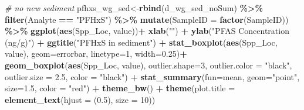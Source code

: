 \documentclass[
]{article}
\newenvironment{Shaded}{\begin{snugshade}}{\end{snugshade}}
\newcommand{\AttributeTok}[1]{\textcolor[rgb]{0.13,0.29,0.53}{#1}}
\newcommand{\CommentTok}[1]{\textcolor[rgb]{0.56,0.35,0.01}{\textit{#1}}}
\newcommand{\DecValTok}[1]{\textcolor[rgb]{0.00,0.00,0.81}{#1}}
\newcommand{\FloatTok}[1]{\textcolor[rgb]{0.00,0.00,0.81}{#1}}
\newcommand{\FunctionTok}[1]{\textcolor[rgb]{0.13,0.29,0.53}{\textbf{#1}}}
\newcommand{\NormalTok}[1]{#1}
\newcommand{\OtherTok}[1]{\textcolor[rgb]{0.56,0.35,0.01}{#1}}
\newcommand{\SpecialCharTok}[1]{\textcolor[rgb]{0.81,0.36,0.00}{\textbf{#1}}}
\newcommand{\StringTok}[1]{\textcolor[rgb]{0.31,0.60,0.02}{#1}}
\begin{document}
\begin{Shaded}
\begin{Highlighting}[]
\CommentTok{\# no new sediment}
\NormalTok{pfhxs\_wg\_sed}\OtherTok{\textless{}{-}}\FunctionTok{rbind}\NormalTok{(d\_wg\_sed\_noSum) }\SpecialCharTok{\%\textgreater{}\%} 
  \FunctionTok{filter}\NormalTok{(Analyte }\SpecialCharTok{==} \StringTok{"PFHxS"}\NormalTok{) }\SpecialCharTok{\%\textgreater{}\%} 
  \FunctionTok{mutate}\NormalTok{(}\AttributeTok{SampleID =} \FunctionTok{factor}\NormalTok{(SampleID)) }\SpecialCharTok{\%\textgreater{}\%} 
  \FunctionTok{ggplot}\NormalTok{(}\FunctionTok{aes}\NormalTok{(Spp\_Loc, value))}\SpecialCharTok{+}
    \FunctionTok{xlab}\NormalTok{(}\StringTok{""}\NormalTok{) }\SpecialCharTok{+}
    \FunctionTok{ylab}\NormalTok{(}\StringTok{"PFAS Concentration (ng/g)"}\NormalTok{) }\SpecialCharTok{+}
    \FunctionTok{ggtitle}\NormalTok{(}\StringTok{"PFHxS in sediment"}\NormalTok{) }\SpecialCharTok{+}
    \FunctionTok{stat\_boxplot}\NormalTok{(}\FunctionTok{aes}\NormalTok{(Spp\_Loc, value),}
                 \AttributeTok{geom=}\StringTok{\textquotesingle{}errorbar\textquotesingle{}}\NormalTok{, }\AttributeTok{linetype=}\DecValTok{1}\NormalTok{, }\AttributeTok{width=}\FloatTok{0.25}\NormalTok{)}\SpecialCharTok{+}
    \FunctionTok{geom\_boxplot}\NormalTok{(}\FunctionTok{aes}\NormalTok{(Spp\_Loc, value),}
                 \AttributeTok{outlier.shape=}\DecValTok{3}\NormalTok{,}
                 \AttributeTok{outlier.color =} \StringTok{"black"}\NormalTok{,}
                 \AttributeTok{outlier.size =} \FloatTok{2.5}\NormalTok{,}
                 \AttributeTok{color =} \StringTok{"black"}\NormalTok{) }\SpecialCharTok{+} 
    \FunctionTok{stat\_summary}\NormalTok{(}\AttributeTok{fun=}\NormalTok{mean, }\AttributeTok{geom=}\StringTok{"point"}\NormalTok{, }\AttributeTok{size=}\FloatTok{1.5}\NormalTok{, }\AttributeTok{color =} \StringTok{"red"}\NormalTok{) }\SpecialCharTok{+}
    \FunctionTok{theme\_bw}\NormalTok{() }\SpecialCharTok{+}
    \FunctionTok{theme}\NormalTok{(}\AttributeTok{plot.title =} \FunctionTok{element\_text}\NormalTok{(}\AttributeTok{hjust =}\NormalTok{ (}\FloatTok{0.5}\NormalTok{), }\AttributeTok{size =} \DecValTok{10}\NormalTok{))}


\end{Highlighting}
\end{Shaded}
\end{document}
